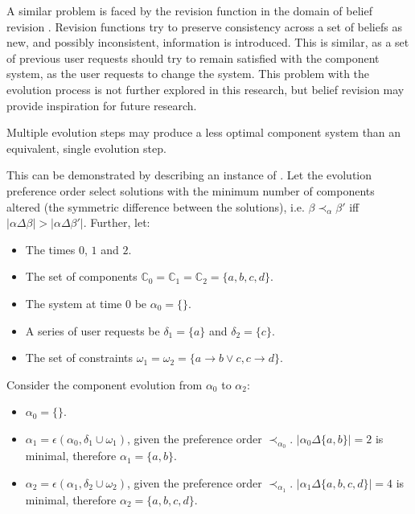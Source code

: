 A similar problem is faced by the revision function in the domain of belief revision \citep{alchourron1985logic}.
Revision functions try to preserve consistency across a set of beliefs as new, and possibly inconsistent, information is introduced.
This is similar, as a set of previous user requests should try to remain satisfied with the component system, as the user requests to change the system.    
This problem with the evolution process is not further explored in this research, but belief revision may provide inspiration for future research.


\begin{obs}
Multiple evolution steps may produce a less optimal component system than an equivalent, single evolution step.
\end{obs}

This can be demonstrated by describing an instance of \modelname.
Let the evolution preference order select solutions with the minimum number of components altered (the symmetric difference between the solutions), 
i.e. $\beta \prec_{\alpha} \beta'$ iff $|\alpha \Delta \beta| > |\alpha \Delta \beta'|$.
Further, let:
\begin{itemize}
  \item The times $0$, $1$ and $2$.
  \item The set of components $\mathbb{C}_0 = \mathbb{C}_1 = \mathbb{C}_2 = \{a,b,c,d\}$.
  \item The system at time $0$ be $\alpha_0 = \{\}$.
  \item A series of user requests be $\delta_1 = \{a\}$ and $ \delta_2 = \{c\}$.
  \item The set of constraints $\omega_1 = \omega_2 = \{a \rightarrow b \vee c, c \rightarrow d\}$.
\end{itemize}

Consider the component evolution from $\alpha_0$ to $\alpha_2$:
\begin{itemize}
  \item $\alpha_0 = \{\}$.
  \item $\alpha_1 = \epsilon(\alpha_0,\delta_1 \cup \omega_1)$, given the preference order $\prec_{\alpha_0}$. $|\alpha_0 \Delta \{a,b\}| = 2$ is minimal, therefore $\alpha_1 = \{a,b\}$.
  \item $\alpha_2 = \epsilon(\alpha_1,\delta_2 \cup \omega_2)$, given the preference order $\prec_{\alpha_1}$. $|\alpha_1 \Delta \{a,b,c,d\}| = 4$ is minimal, therefore $\alpha_2 = \{a,b,c,d\}$.
\end{itemize}

